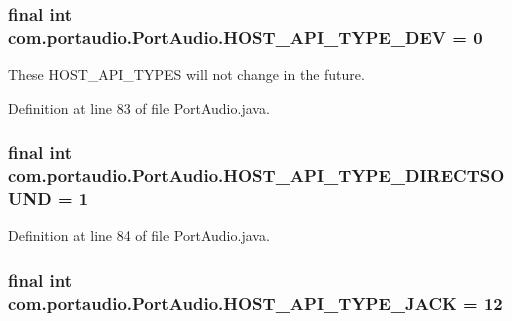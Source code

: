 \subsubsection[{\texorpdfstring{H\+O\+S\+T\+\_\+\+A\+P\+I\+\_\+\+T\+Y\+P\+E\+\_\+\+D\+EV}{HOST_API_TYPE_DEV}}]{\setlength{\rightskip}{0pt plus 5cm}final {\bf int} com.\+portaudio.\+Port\+Audio.\+H\+O\+S\+T\+\_\+\+A\+P\+I\+\_\+\+T\+Y\+P\+E\+\_\+\+D\+EV = 0\hspace{0.3cm}{\ttfamily [static]}}\hypertarget{classcom_1_1portaudio_1_1_port_audio_a5aeefa7a9316b0fd60265a3b336e7a40}{}\label{classcom_1_1portaudio_1_1_port_audio_a5aeefa7a9316b0fd60265a3b336e7a40}
These H\+O\+S\+T\+\_\+\+A\+P\+I\+\_\+\+T\+Y\+P\+ES will not change in the future. 

Definition at line 83 of file Port\+Audio.\+java.

\subsubsection[{\texorpdfstring{H\+O\+S\+T\+\_\+\+A\+P\+I\+\_\+\+T\+Y\+P\+E\+\_\+\+D\+I\+R\+E\+C\+T\+S\+O\+U\+ND}{HOST_API_TYPE_DIRECTSOUND}}]{\setlength{\rightskip}{0pt plus 5cm}final {\bf int} com.\+portaudio.\+Port\+Audio.\+H\+O\+S\+T\+\_\+\+A\+P\+I\+\_\+\+T\+Y\+P\+E\+\_\+\+D\+I\+R\+E\+C\+T\+S\+O\+U\+ND = 1\hspace{0.3cm}{\ttfamily [static]}}\hypertarget{classcom_1_1portaudio_1_1_port_audio_a6a986e1b33fc0f6dfb6c7d562a4d51d9}{}\label{classcom_1_1portaudio_1_1_port_audio_a6a986e1b33fc0f6dfb6c7d562a4d51d9}


Definition at line 84 of file Port\+Audio.\+java.

\subsubsection[{\texorpdfstring{H\+O\+S\+T\+\_\+\+A\+P\+I\+\_\+\+T\+Y\+P\+E\+\_\+\+J\+A\+CK}{HOST_API_TYPE_JACK}}]{\setlength{\rightskip}{0pt plus 5cm}final {\bf int} com.\+portaudio.\+Port\+Audio.\+H\+O\+S\+T\+\_\+\+A\+P\+I\+\_\+\+T\+Y\+P\+E\+\_\+\+J\+A\+CK = 12\hspace{0.3cm}{\ttfamily [static]}}\hypertarget{classcom_1_1portaudio_1_1_port_audio_a883a151e9c2fa3df4bc2a246441dcf65}{}\label{classcom_1_1portaudio_1_1_port_audio_a883a151e9c2fa3df4bc2a246441dcf65}


